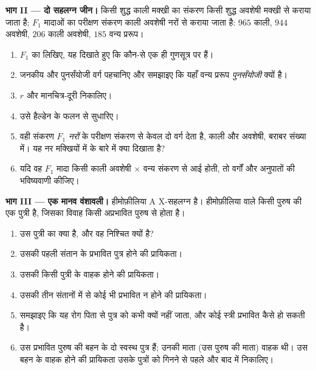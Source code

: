 \begin{problem}
\medskip
\noindent\textbf{भाग II --- दो सहलग्न जीन।}
किसी शुद्ध काली मक्खी का संकरण किसी शुद्ध अवशेषी मक्खी से कराया जाता है;
$F_1$ मादाओं का परीक्षण संकरण काली अवशेषी नरों से कराया जाता है: $965$ काली,
$944$ अवशेषी, $206$ काली अवशेषी, $185$ वन्य प्ररूप।
\begin{enumerate}[resume]
  \item $F_1$ का  लिखिए, यह दिखाते हुए कि कौन-से
         एक ही गुणसूत्र पर हैं।
  \item जनकीय और पुनर्संयोजी वर्ग पहचानिए और समझाइए कि यहाँ वन्य
        प्ररूप \emph{पुनर्संयोजी} क्यों है।
  \item $r$ और मानचित्र-दूरी निकालिए।
  \item उसे हैल्डेन के फलन से सुधारिए।
  \item वही संकरण $F_1$ \emph{नरों} के परीक्षण संकरण से केवल दो वर्ग
        देता है, काली और अवशेषी, बराबर संख्या में। यह नर मक्खियों में
         के बारे में क्या दिखाता है?
  \item यदि वह $F_1$ मादा किसी काली अवशेषी $\times$ वन्य संकरण से आई
        होती, तो वर्गों और अनुपातों की भविष्यवाणी कीजिए।
\end{enumerate}

\medskip
\noindent\textbf{भाग III --- एक मानव वंशावली।}
हीमोफ़ीलिया A X-सहलग्न  है। हीमोफ़ीलिया वाले किसी पुरुष की एक
पुत्री है, जिसका विवाह किसी अप्रभावित पुरुष से होता है।
\begin{enumerate}[resume]
  \item उस पुत्री का  क्या है, और वह निश्चित क्यों है?
  \item उसकी पहली संतान के प्रभावित पुत्र होने की प्रायिकता।
  \item उसकी किसी पुत्री के वाहक होने की प्रायिकता।
  \item उसकी तीन संतानों में से कोई भी प्रभावित न होने की प्रायिकता।
  \item समझाइए कि यह रोग पिता से पुत्र को कभी क्यों नहीं जाता, और कोई
        स्त्री प्रभावित कैसे हो सकती है।
  \item उस प्रभावित पुरुष की बहन के दो स्वस्थ पुत्र हैं; उनकी माता
        (उस पुरुष की माता) वाहक थी। उस बहन के वाहक होने की प्रायिकता
        उसके पुत्रों को गिनने से पहले और बाद में निकालिए।
\end{enumerate}


\end{problem}
